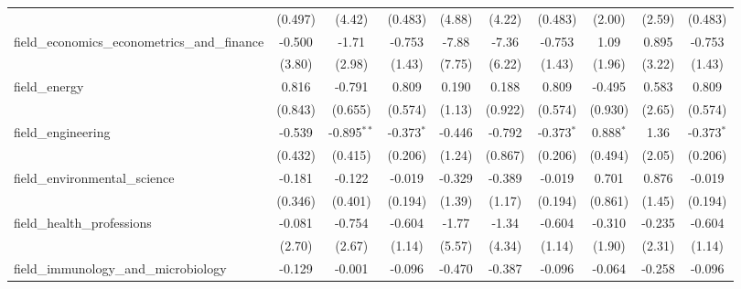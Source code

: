 \begin{tabular}{lccccccccc}
                                                               & (0.497)     & (4.42)        & (0.483)       & (4.88)   & (4.22)     & (0.483)       & (2.00)        & (2.59)        & (0.483)\\   
   field\_economics\_econometrics\_and\_finance                & -0.500      & -1.71         & -0.753        & -7.88    & -7.36      & -0.753        & 1.09          & 0.895         & -0.753\\   
                                                               & (3.80)      & (2.98)        & (1.43)        & (7.75)   & (6.22)     & (1.43)        & (1.96)        & (3.22)        & (1.43)\\   
   field\_energy                                               & 0.816       & -0.791        & 0.809         & 0.190    & 0.188      & 0.809         & -0.495        & 0.583         & 0.809\\   
                                                               & (0.843)     & (0.655)       & (0.574)       & (1.13)   & (0.922)    & (0.574)       & (0.930)       & (2.65)        & (0.574)\\   
   field\_engineering                                          & -0.539      & -0.895$^{**}$ & -0.373$^{*}$  & -0.446   & -0.792     & -0.373$^{*}$  & 0.888$^{*}$   & 1.36          & -0.373$^{*}$\\   
                                                               & (0.432)     & (0.415)       & (0.206)       & (1.24)   & (0.867)    & (0.206)       & (0.494)       & (2.05)        & (0.206)\\   
   field\_environmental\_science                               & -0.181      & -0.122        & -0.019        & -0.329   & -0.389     & -0.019        & 0.701         & 0.876         & -0.019\\   
                                                               & (0.346)     & (0.401)       & (0.194)       & (1.39)   & (1.17)     & (0.194)       & (0.861)       & (1.45)        & (0.194)\\   
   field\_health\_professions                                  & -0.081      & -0.754        & -0.604        & -1.77    & -1.34      & -0.604        & -0.310        & -0.235        & -0.604\\   
                                                               & (2.70)      & (2.67)        & (1.14)        & (5.57)   & (4.34)     & (1.14)        & (1.90)        & (2.31)        & (1.14)\\   
   field\_immunology\_and\_microbiology                        & -0.129      & -0.001        & -0.096        & -0.470   & -0.387     & -0.096        & -0.064        & -0.258        & -0.096\\   

\end{tabular}
